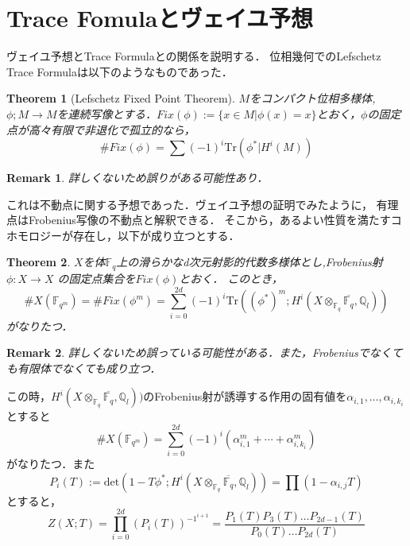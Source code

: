 \documentclass{ujarticle}
\newtheorem{thm}{Theorem}[section]
\newtheorem*{rem}{Remark}
\begin{document}
\section{Trace Fomulaとヴェイユ予想}
\label{Trace Fomulaとヴェイユ予想}
ヴェイユ予想とTrace Formulaとの関係を説明する．
位相幾何でのLefschetz Trace Formulaは以下のようなものであった．
\begin{thm}[Lefschetz Fixed Point Theorem]
 $M$をコンパクト位相多様体,$\phi;M \to M$を連続写像とする．$Fix(\phi):=\{ x \in M |\phi (x)=x\}$とおく，$\phi$の固定点が高々有限で非退化で孤立的なら，
 \begin{equation*}
   \#Fix(\phi) = \sum(-1)^i \mathrm{Tr}(\phi^*| H^i(M))
 \end{equation*}
\end{thm}
\begin{rem}
 詳しくないため誤りがある可能性あり．
\end{rem}
これは不動点に関する予想であった．ヴェイユ予想の証明でみたように，
有理点はFrobenius写像の不動点と解釈できる．
そこから，あるよい性質を満たすコホモロジーが存在し，以下が成り立つとする．
\begin{thm}
  $X$を体$\mathbb{F}_q$上の滑らかなd次元射影的代数多様体とし,Frobenius射$\phi: X \to X$ の固定点集合を$Fix(\phi)$とおく．
このとき，
\begin{equation*}
  \#X(\mathbb{F}_{q^m})=\#Fix(\phi^m)= \sum_{i=0}^{2d}(-1)^i
  \mathrm{Tr}((\phi^{*})^m;H^i(X \otimes_{\mathbb{F}_q} \overline{\mathbb{F}_q}, \mathbb{Q}_l))
\end{equation*}
がなりたつ．
\end{thm}
\begin{rem}
 詳しくないため誤っている可能性がある．また，Frobeniusでなくても有限体でなくても成り立つ．
\end{rem}
この時，$H^i(X \otimes_{\mathbb{F}_q} \overline{\mathbb{F}_q}, \mathbb{Q}_l))$のFrobenius射が誘導する作用の固有値を$\alpha_{i,1},\dots,\alpha_{i,k_i}$とすると
\begin{equation*}
　\#X(\mathbb{F}_{q^m})=\sum_{i=0}^{2d}(-1)^i(\alpha_{i,1}^m + \cdots + \alpha_{i,k_i}^m)
\end{equation*}
がなりたつ．また
\begin{equation*}
  P_i(T):=\mathrm{det}(1-T\phi^{*};H^i(X \otimes_{\mathbb{F}_q} \overline{\mathbb{F}_q}, \mathbb{Q}_l))=\prod(1-\alpha_{i,j}T)
\end{equation*}
とすると，
\begin{equation*}
 Z(X;T)=\prod_{i=0}^{2d}(P_i(T))^{{-1}^{i+1}}= \frac{P_1(T)P_3(T)\dots P_{2d-1}(T)}{P_0(T)\dots P_{2d}(T)}
\end{equation*}
\end{document}
